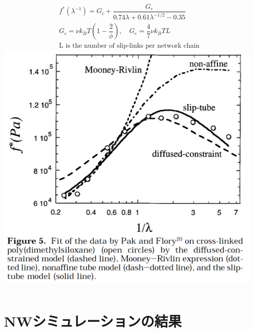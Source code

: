 \documentclass[12pt, dvipdfmx]{beamer}
\begin{document}
\begin{frame}
			\begin{columns}[totalwidth=1\textwidth]
				\scriptsize
				\begin{align*}
					&f^*(\lambda^{-1}) = G_c + \dfrac{G_e}{0.74 \lambda + 0.61 \lambda^{-1/2} - 0.35} \\
					&G_c = \nu k_B T \left(1-\dfrac{2}{\phi} \right), \quad G_e = \dfrac{4}{7} \nu k_B T L \\
					& \text{L is the number of slip-links per network chain}
				\end{align*}
				\includegraphics[width=.9\textwidth]{NW_model_rubinstein.png}
			\end{columns}
\end{frame}

\section{NWシミュレーションの結果}
\end{document}

